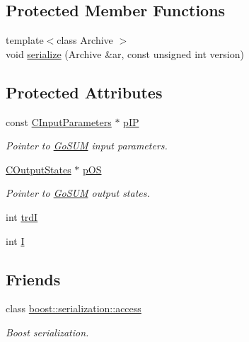 \subsection*{Protected Member Functions}
\begin{DoxyCompactItemize}
\item 
{\footnotesize template$<$class Archive $>$ }\\void \hyperlink{class_go_s_u_m_1_1_c_model_evaluator_a80e334f1496f3bee1da84cee050a72a1}{serialize} (Archive \&ar, const unsigned int version)
\end{DoxyCompactItemize}
\subsection*{Protected Attributes}
\begin{DoxyCompactItemize}
\item 
const \hyperlink{class_go_s_u_m_1_1_c_input_parameters}{C\-Input\-Parameters} $\ast$ \hyperlink{class_go_s_u_m_1_1_c_model_evaluator_a1d6e69bc264c99eda155fe72915fbc8b}{p\-I\-P}
\begin{DoxyCompactList}\small\item\em Pointer to \hyperlink{struct_go_s_u_m}{Go\-S\-U\-M} input parameters. \end{DoxyCompactList}\item 
\hyperlink{class_go_s_u_m_1_1_c_output_states}{C\-Output\-States} $\ast$ \hyperlink{class_go_s_u_m_1_1_c_model_evaluator_a3acd5d24b64c3fbc6b73dad5ea5b9f43}{p\-O\-S}
\begin{DoxyCompactList}\small\item\em Pointer to \hyperlink{struct_go_s_u_m}{Go\-S\-U\-M} output states. \end{DoxyCompactList}\item 
int \hyperlink{class_go_s_u_m_1_1_c_model_evaluator_a3c67f2a94d451003729e0334746637df}{trd\-I}
\item 
int \hyperlink{class_go_s_u_m_1_1_c_model_evaluator_a1098859defc90ea05ba7223b951d4d3b}{I}
\end{DoxyCompactItemize}
\subsection*{Friends}
\begin{DoxyCompactItemize}
\item 
class \hyperlink{class_go_s_u_m_1_1_c_model_evaluator_ac98d07dd8f7b70e16ccb9a01abf56b9c}{boost\-::serialization\-::access}
\begin{DoxyCompactList}\small\item\em Boost serialization. \end{DoxyCompactList}\end{DoxyCompactItemize}
